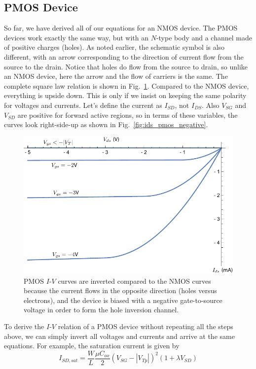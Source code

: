 \subsection{PMOS Device}
So far, we have derived all of our equations for an NMOS device.  The  PMOS devices work exactly the same way, but with an $N$-type body and a channel made of positive charges (holes).  As noted earlier, the schematic symbol is also different, with an arrow corresponding to the direction of current flow from the source to the drain.  Notice that holes do flow from the source to drain, so unlike an NMOS device, here the arrow and the flow of carriers is the same.  The complete square law relation is shown in Fig.~\ref{fig:idspmos}.  Compared to the NMOS device, everything is upside down. This is only if we insist on keeping the same polarity for voltages and currents.  Let's define the current as $I_{SD}$, not $I_{DS}$.   Also $V_{SG}$ and $V_{SD}$ are positive for forward active regions, so in terms of these variables, the curves look right-side-up as shown in Fig.~\ref{fig:ids_pmos_negative}.
\begin{figure}[tb]
\centering
\includegraphics[width=.75\columnwidth]{idspmos}
\caption{PMOS $I$-$V$ curves are inverted compared to the NMOS curves because the current flows in the opposite direction (holes versus electrons), and the device is biased with a negative gate-to-source voltage in order to form the hole inversion channel.}
\label{fig:idspmos}
\end{figure}
To derive the $I$-$V$ relation of a PMOS device without repeating all the steps above, we can simply invert all voltages and currents and arrive at the same equations.  For example, the saturation current is given by
    \begin{equation}
        {I_{SD,sat}} = \frac{W}{L}\frac{{\mu {C_{ox}}}}{2}{({V_{SG}} - {|V_{Tp}|})^2}(1 + \lambda {V_{SD}})
    \end{equation}
